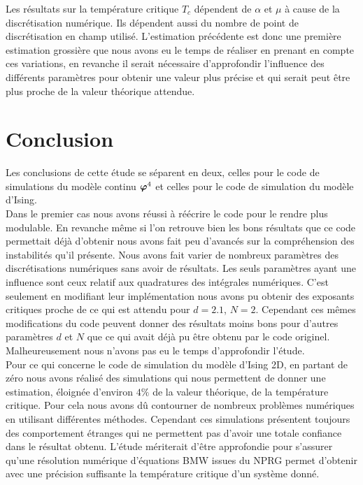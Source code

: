 \documentclass[10.5pt]{article}
\begin{document}
\begin{multicols}{2}
Les résultats sur la température critique $T_c$ dépendent de $\alpha$ et $\mu$ à cause de la discrétisation numérique. Ils dépendent aussi du nombre de point de discrétisation en champ utilisé. L'estimation précédente est donc une première estimation grossière que nous avons eu le temps de réaliser en prenant en compte ces variations, en revanche il serait nécessaire d'approfondir l'influence des différents paramètres pour obtenir une valeur plus précise et qui serait peut être plus proche de la valeur théorique attendue.


\section{Conclusion}

Les conclusions de cette étude se séparent en deux, celles pour le code de simulations du modèle continu $\boldsymbol{ \varphi}^4$ et celles pour le code de simulation du modèle d'Ising. \\

Dans le premier cas nous avons réussi à réécrire le code pour le rendre plus modulable. En revanche même si l'on retrouve bien les bons résultats que ce code permettait déjà d'obtenir nous avons fait peu d'avancés sur la compréhension des instabilités qu'il présente. Nous avons fait varier de nombreux paramètres des discrétisations numériques sans avoir de résultats. Les seuls paramètres ayant une influence sont ceux relatif aux quadratures des intégrales numériques. C'est seulement en modifiant leur implémentation nous avons pu obtenir des exposants critiques proche de ce qui est attendu pour $d=2.1$, $N=2$. Cependant ces mêmes modifications du code peuvent donner des résultats moins bons pour d'autres paramètres $d$ et $N$ que ce qui avait déjà pu être obtenu par le code originel. Malheureusement nous n'avons pas eu le temps d'approfondir l'étude. \\


Pour ce qui concerne le code de simulation du modèle d'Ising 2D, en partant de zéro nous avons réalisé des simulations qui nous permettent de donner une estimation, éloignée d'environ $4 \%$ de la valeur théorique, de la température critique. Pour cela nous avons dû contourner de nombreux problèmes numériques en utilisant différentes méthodes. Cependant ces simulations présentent toujours des comportement étranges qui ne permettent pas d'avoir une totale confiance dans le résultat obtenu. L'étude mériterait d'être approfondie pour s'assurer qu'une résolution numérique d'équations BMW issues du NPRG permet d'obtenir avec une précision suffisante la température critique d'un système donné.

\vfill

\pagebreak





\end{multicols}
\end{document}
